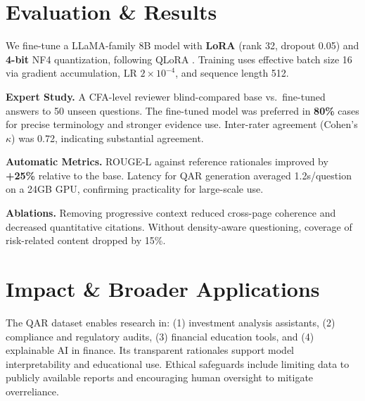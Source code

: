 \documentclass[sigconf,authordraft,anonymous]{acmart}
\begin{document}
\section{Evaluation \& Results}
We fine-tune a LLaMA-family 8B model with \textbf{LoRA} (rank 32, dropout 0.05) and \textbf{4-bit} NF4 quantization, following QLoRA \cite{dettmers2023qloraefficientfinetuningquantized}. Training uses effective batch size 16 via gradient accumulation, LR $2\!\times\!10^{-4}$, and sequence length 512.

\textbf{Expert Study.} A CFA-level reviewer blind-compared base vs.\ fine-tuned answers to 50 unseen questions. The fine-tuned model was preferred in \textbf{80\%} cases for precise terminology and stronger evidence use. Inter-rater agreement (Cohen’s $\kappa$) was 0.72, indicating substantial agreement.

\textbf{Automatic Metrics.} ROUGE-L against reference rationales improved by \textbf{+25\%} relative to the base. Latency for QAR generation averaged 1.2s/question on a 24GB GPU, confirming practicality for large-scale use.

\textbf{Ablations.} Removing progressive context reduced cross-page coherence and decreased quantitative citations. Without density-aware questioning, coverage of risk-related content dropped by 15\%.

\section{Impact \& Broader Applications}
The QAR dataset enables research in: (1) investment analysis assistants, (2) compliance and regulatory audits, (3) financial education tools, and (4) explainable AI in finance. Its transparent rationales support model interpretability and educational use. Ethical safeguards include limiting data to publicly available reports and encouraging human oversight to mitigate overreliance. 







\appendix
\end{document}

